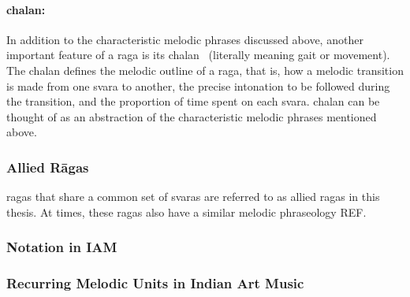 
\paragraph{\Gls{chalan}:} In addition to the characteristic melodic phrases discussed above, another important feature of a \gls{raga} is its \gls{chalan}~\citep{rao1999raga} (literally meaning gait or movement). The \gls{chalan} defines the melodic outline of a \gls{raga}, that is, how a melodic transition is made from one \gls{svara} to another, the precise intonation to be followed during the transition, and the proportion of time spent on each \gls{svara}. \Gls{chalan} can be thought of as an abstraction of the characteristic melodic phrases mentioned above.

\subsubsection{Allied R\={a}gas}
\label{sec:allied_ragas}

\Glspl{raga} that share a common set of \glspl{svara} are referred to as allied \glspl{raga} in this thesis. At times, these \glspl{raga} also have a similar melodic phraseology REF. 

\subsubsection{Notation in IAM}
\label{sec:notation_in_iam}



\subsubsection{Recurring Melodic Units in Indian Art Music}
\label{sec:recurring_melodic_patterns_iam}

